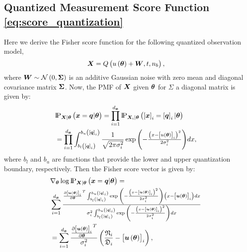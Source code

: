 \subsection{Quantized Measurement Score Function \eqref{eq:score_quantization}}\label{apx:derivation_q_score}
Here we derive the {Fisher} score function for the  %
following quantized observation model,
\begin{equation}
\X=Q\brackets{u\brackets{\p}+\randomvec{W},t,n_b},
\end{equation}
where $\randomvec{W}\sim\normaldis{0}{\matsym{\Sigma}}$ is an additive  Gaussian noise with zero mean and diagonal covariance matrix $\mathbf{\Sigma}$. Now, the PMF of $\X$ given $\bm{\theta}$ {%
for $\Sigma$ %
a diagonal matrix %
} is given by:
\begin{align}
    &\pmft{\x=\vectorsym{q}|\p}{\X|\p}=\prod_{i=1}^{\nx}\pmft{\squareb{\x}_i=\squareb{\vectorsym{q}}_i|\p}{\X_i|\p}\nonumber\\
&=\prod_{i=1}^{\nx}\int_{b_l\brackets{\squareb{\vectorsym{q}}_i}}^{b_u\brackets{\squareb{\vectorsym{q}}_i}} \frac{1}{\sqrt{2\pi\sigma^2_i}}\exp{\brackets{-\tfrac{\brackets{x-\squareb{u\brackets{\p}}_i}^2}{2\sigma^2_i}}}dx,
\end{align}
where  $b_l$ and $b_u$ are functions that provide the lower  and upper quantization boundary, respectively.
Then the Fisher score vector is given by:
\begin{align}\label{eq:score_quant}
    &\nabla_{\p}\log\pmft{\x=\vectorsym{q}|\p}{\X|\p}=\nonumber\\
    &\sum_{i=1}^{\nx}\tfrac{\frac{\partial\squareb{\vectorsym{u}\brackets{\p}}_i}{\partial\p}   ^T\int_{b_l\brackets{\squareb{\vectorsym{q}}_i}}^{b_u\brackets{\squareb{\vectorsym{q}}_i}} \exp{\brackets{-\frac{\brackets{x-\squareb{\vectorsym{u}\brackets{\p}}_i}^2}{2\sigma^2_i}}}\brackets{x-\squareb{\vectorsym{u}\brackets{\p}}_i}dx}{\sigma^2_i\int_{b_l\brackets{\squareb{\vectorsym{q}}_i}}^{b_u\brackets{\squareb{\vectorsym{q}}_i}} \exp{\brackets{-\frac{\brackets{x-\squareb{\vectorsym{u}\brackets{\p}}_i}^2}{2\sigma^2_i}}}dx}\nonumber\\
    &=\sum_{i=1}^{\nx}\frac{\frac{\partial\squareb{\vectorsym{u}\brackets{\p}}_i}{\partial\p}^T}{\sigma^2_i}\brackets{\frac{\mathfrak{N}_i}{\mathfrak{D}_i} -\squareb{\vectorsym{u}\brackets{\p}}_i},
\end{align}
